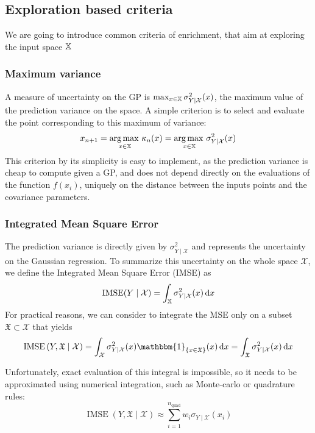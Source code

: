 \documentclass[../../Main_ManuscritThese.tex]{subfiles}
\newcommand{\IMSE}{\mathop{\mathrm{IMSE}}}
\begin{document}
\subsection{Exploration based criteria}

We are going to introduce common criteria of enrichment, that aim at exploring the input space $\mathbb{X}$

\subsubsection{Maximum variance}
A measure of uncertainty on the GP is $\max_{x\in\mathbb{X}} \sigma_{Y \mid \mathcal{X}}^2(x)$, the maximum value of the prediction variance on the space.
A simple criterion is to select and evaluate the point corresponding to this maximum of variance:
\begin{equation}
  x_{n+1} = \operatorname*{arg\,max \,}_{x\in \mathbb{X}} \kappa_n(x) = \operatorname*{arg\,max \,}_{x \in \mathbb{X}} \sigma^2_{Y \mid \mathcal{X}}(x)
\end{equation}
This criterion by its simplicity is easy to implement, as the prediction variance is cheap to compute given a GP, and does not depend directly on the evaluations of the function $f(x_i)$, uniquely on the distance between the inputs points and the covariance parameters.

\subsubsection{Integrated Mean Square Error}
\cite{sacks_designs_1989}
The prediction variance is directly given by $\sigma^2_{Y\mid \mathcal{X}}$ and represents the uncertainty on the Gaussian regression. To summarize this uncertainty on the whole space $\mathcal{X}$, we define the Integrated Mean Square Error (IMSE) as
\begin{equation}
  \IMSE(Y \mid \mathcal{X}) = \int_{\Xspace} \sigma_{Y\mid\mathcal{X}}^2(x)\,\mathrm{d}x
\end{equation}
For practical reasons, we can consider to integrate the MSE only on a subset $\mathfrak{X}\subset \mathcal{X}$ that yields
\begin{equation}
  \IMSE\left(Y,\mathfrak{X} \mid \mathcal{X} \right) = \int_{\mathcal{X}} \sigma^2_{Y\mid \mathcal{X}}(x)  \mathbbm{1}_{\{x \in \mathfrak{X}\}}(x)\,\mathrm{d}x = \int_{\mathfrak{X}} \sigma^2_{Y\mid \mathcal{X}}(x)\,\mathrm{d}x
\end{equation}

Unfortunately, exact evaluation of this integral is impossible, so it needs to be approximated using numerical integration, such as Monte-carlo or quadrature rules:
\begin{equation}
  \IMSE(Y,\mathfrak{X} \mid \mathcal{X}) \approx \sum_{i=1}^{n_{\mathrm{quad}}} w_i \sigma_{Y\mid\mathcal{X}}(x_i)
\end{equation}
\end{document}
